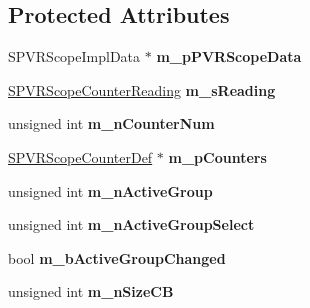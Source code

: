 \subsection*{Protected Attributes}
\begin{DoxyCompactItemize}
\item 
\hypertarget{class_c_p_v_r_scope_graph_a876a43ef087cd5f12c39f17991459495}{S\+P\+V\+R\+Scope\+Impl\+Data $\ast$ {\bfseries m\+\_\+p\+P\+V\+R\+Scope\+Data}}\label{class_c_p_v_r_scope_graph_a876a43ef087cd5f12c39f17991459495}

\item 
\hypertarget{class_c_p_v_r_scope_graph_ab3e2c6076bca6c30961e96c3ef923347}{\hyperlink{struct_s_p_v_r_scope_counter_reading}{S\+P\+V\+R\+Scope\+Counter\+Reading} {\bfseries m\+\_\+s\+Reading}}\label{class_c_p_v_r_scope_graph_ab3e2c6076bca6c30961e96c3ef923347}

\item 
\hypertarget{class_c_p_v_r_scope_graph_a253c34d6e12a67b2279adade8272cd0a}{unsigned int {\bfseries m\+\_\+n\+Counter\+Num}}\label{class_c_p_v_r_scope_graph_a253c34d6e12a67b2279adade8272cd0a}

\item 
\hypertarget{class_c_p_v_r_scope_graph_a36105f291b147473618d5061ff86f7c0}{\hyperlink{struct_s_p_v_r_scope_counter_def}{S\+P\+V\+R\+Scope\+Counter\+Def} $\ast$ {\bfseries m\+\_\+p\+Counters}}\label{class_c_p_v_r_scope_graph_a36105f291b147473618d5061ff86f7c0}

\item 
\hypertarget{class_c_p_v_r_scope_graph_aec6243d5470201011753b7762e029ed2}{unsigned int {\bfseries m\+\_\+n\+Active\+Group}}\label{class_c_p_v_r_scope_graph_aec6243d5470201011753b7762e029ed2}

\item 
\hypertarget{class_c_p_v_r_scope_graph_ad36d69f7c400ae178d32d6e569169218}{unsigned int {\bfseries m\+\_\+n\+Active\+Group\+Select}}\label{class_c_p_v_r_scope_graph_ad36d69f7c400ae178d32d6e569169218}

\item 
\hypertarget{class_c_p_v_r_scope_graph_aa3e6d675181e773dee8d911d62d1d11a}{bool {\bfseries m\+\_\+b\+Active\+Group\+Changed}}\label{class_c_p_v_r_scope_graph_aa3e6d675181e773dee8d911d62d1d11a}

\item 
\hypertarget{class_c_p_v_r_scope_graph_ace1519500363c1479db9e81b1a0f130b}{unsigned int {\bfseries m\+\_\+n\+Size\+C\+B}}\label{class_c_p_v_r_scope_graph_ace1519500363c1479db9e81b1a0f130b}


\end{DoxyCompactItemize}

